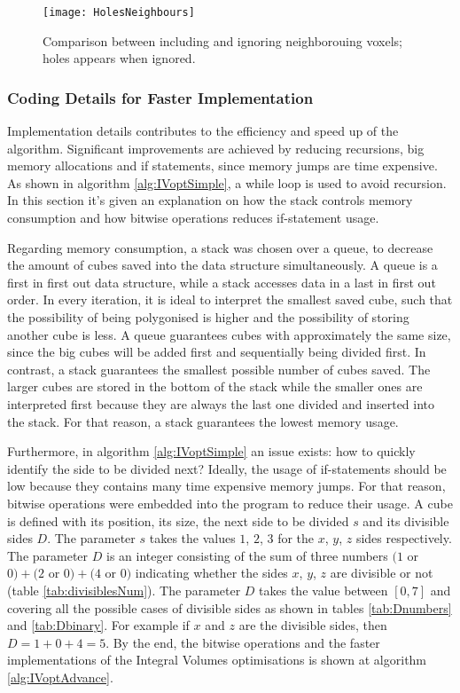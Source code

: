 \documentclass{subfiles}
\begin{document}
\begin{figure}[!htbp]
	\centering
	\texttt{[image: HolesNeighbours]}
	\caption{Comparison between including and ignoring neighborouing voxels; holes appears when ignored.}
	\label{fig:IVholesNeighbours}
\end{figure}

\subsubsection{Coding Details for Faster Implementation}\label{sec:IVcodeDetails}
Implementation details contributes to the efficiency and speed up of the algorithm. Significant improvements are achieved by reducing recursions, big memory allocations and if statements, since memory jumps are time expensive. As shown in algorithm \ref{alg:IVoptSimple}, a while loop is used to avoid recursion. In this section it's given an explanation on how the stack controls memory consumption and how bitwise operations reduces if-statement usage. 

Regarding memory consumption, a stack was chosen over a queue, to decrease the amount of cubes saved into the data structure simultaneously. A queue is a first in first out data structure, while a stack accesses data in a last in first out order. In every iteration, it is ideal to interpret the smallest saved cube, such that the possibility of being polygonised is higher and the possibility of storing another cube is less. A queue guarantees cubes with approximately the same size, since the big cubes will be added first and sequentially being divided first. In contrast, a stack guarantees the smallest possible number of cubes saved. The larger cubes are stored in the bottom of the stack while the smaller ones are interpreted first because they are always the last one divided and inserted into the stack.  For that reason, a stack guarantees the lowest memory usage. 

Furthermore, in algorithm \ref{alg:IVoptSimple} an issue exists: how to quickly identify the side to be divided next? Ideally, the usage of if-statements should be low because they contains many time expensive memory jumps. For that reason, bitwise operations were embedded into the program to reduce their usage. A cube is defined with its position, its size, the next side to be divided $s$ and its divisible sides $D$. The parameter $s$ takes the values $1$, $2$, $3$ for the $x$, $y$, $z$ sides respectively. The parameter $D$ is an integer consisting of the sum of three numbers $(1$ or $0)+(2$ or $0)+(4$ or $0)$ indicating whether the sides  $x$, $y$, $z$ are divisible or not (table \ref{tab:divisiblesNum}). The parameter $D$ takes the value between $[0,7]$ and covering all the possible cases of divisible sides as shown in tables \ref{tab:Dnumbers} and \ref{tab:Dbinary}. For example if $x$ and $z$ are the divisible sides, then $D = 1+0+4 = 5$. By the end, the bitwise operations and the faster implementations of the Integral Volumes optimisations is shown at algorithm \ref{alg:IVoptAdvance}.
\end{document}
